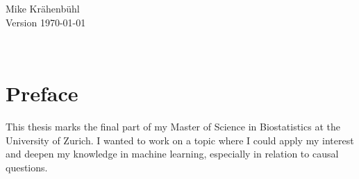 \documentclass[11pt,a4paper,twoside]{book}
\begin{document}


\graphicspath{{./figure/}}
\setcounter{tocdepth}{1}

\thispagestyle{empty}
\begin{center}
%

	\vspace*{6cm}{\bfseries\Huge
	Causal Modeling \\
	with Neural Networks \\ [5mm]
and \\ [5mm]
Individualized Treatment Effect Estimation \\ [5mm]
	}
	
	

  \vfill
  \rm

  \LARGE
  Mike Kr{\"a}henb{\"u}hl\\[12mm]
  
  \normalsize
  Version \today
\end{center}
\newpage
\thispagestyle{empty}~
\newpage
{}

\thispagestyle{plain}
\tableofcontents
{}

\chapter*{Preface}
\thispagestyle{plain}



This thesis marks the final part of my Master of Science in Biostatistics at the University of Zurich. I wanted to work on a topic where I could apply my interest and deepen my knowledge in machine learning, especially in relation to causal questions.
\end{document}
